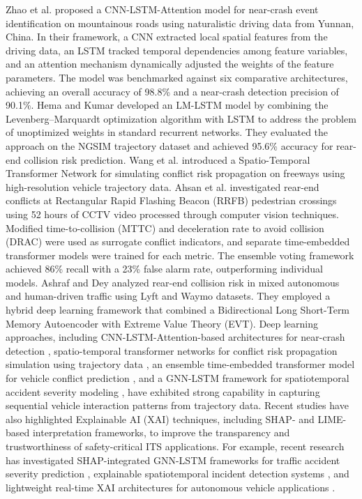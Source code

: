 \documentclass[12pt]{article}
\begin{document}
\begin{enumerate}
Zhao et al. \cite{zhao2024cnn} proposed a CNN-LSTM-Attention model for near-crash event identification on mountainous roads using naturalistic driving data from Yunnan, China. In their framework, a CNN extracted local spatial features from the driving data, an LSTM tracked temporal dependencies among feature variables, and an attention mechanism dynamically adjusted the weights of the feature parameters. The model was benchmarked against six comparative architectures, achieving an overall accuracy of 98.8\% and a near-crash detection precision of 90.1\%. Hema and Kumar \cite{hema2022levenberg} developed an LM-LSTM model by combining the Levenberg–Marquardt optimization algorithm with LSTM to address the problem of unoptimized weights in standard recurrent networks. 
They evaluated the approach on the NGSIM trajectory dataset and achieved 95.6\% accuracy for rear-end collision risk prediction. Wang et al. \cite{wang2024spatio} introduced a Spatio-Temporal Transformer Network for simulating conflict risk propagation on freeways using high-resolution vehicle trajectory data. Ahsan et al. \cite{ahsan2025ensemble} investigated rear-end conflicts at Rectangular Rapid Flashing Beacon (RRFB) pedestrian crossings using 52 hours of CCTV video processed through computer vision techniques. Modified time-to-collision (MTTC) and deceleration rate to avoid collision (DRAC) were used as surrogate conflict indicators, and separate time-embedded transformer models were trained for each metric. The ensemble voting framework achieved 86\% recall with a 23\% false alarm rate, outperforming individual models. Ashraf and Dey \cite{ashraf2025rear} analyzed rear-end collision risk in mixed autonomous and human-driven traffic using Lyft and Waymo datasets. They employed a hybrid deep learning framework that combined a Bidirectional Long Short-Term Memory Autoencoder with Extreme Value Theory (EVT).
Deep learning approaches, including CNN-LSTM-Attention-based architectures for near-crash detection \cite{zhao2024cnn}, spatio-temporal transformer networks for conflict risk propagation simulation using trajectory data \cite{wang2024spatio}, an ensemble time-embedded transformer model for vehicle conflict prediction \cite{ahsan2025ensemble}, and a GNN-LSTM framework for spatiotemporal accident severity modeling \cite{alnowaiser2025computational}, have exhibited strong capability in capturing sequential vehicle interaction patterns from trajectory data. Recent studies have also highlighted Explainable AI (XAI) techniques, including SHAP- and LIME-based interpretation frameworks, to improve the transparency and trustworthiness of safety-critical ITS applications. For example, recent research has investigated SHAP-integrated GNN-LSTM frameworks for traffic accident severity prediction \cite{alnowaiser2025computational}, explainable spatiotemporal incident detection systems \cite{zhai2025toward}, and lightweight real-time XAI architectures for autonomous vehicle applications \cite{tahir2024novel}.


\end{enumerate}
\end{document}
